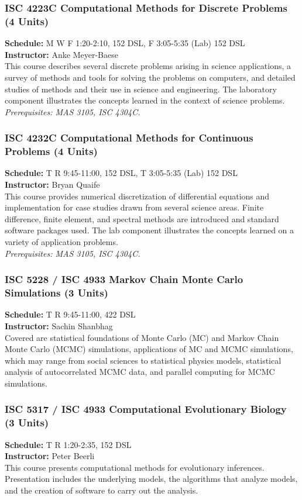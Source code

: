 \documentclass[12pt,a4paper]{article}
\begin{document}
\subsubsection*{ISC 4223C Computational Methods for Discrete Problems (4 Units)}
\textbf{Schedule:} M W F 1:20-2:10, 152 DSL, F 3:05-5:35 (Lab) 152 DSL \\
\textbf{Instructor:} Anke Meyer-Baese \\
This course describes several discrete problems arising in science applications, a survey of methods and tools for solving the problems on computers, and detailed studies of methods and their use in science and engineering. The laboratory component illustrates the concepts learned in the context of science problems. \\
\textit{Prerequisites: MAS 3105, ISC 4304C.}

\subsubsection*{ISC 4232C Computational Methods for Continuous Problems (4 Units)}
\textbf{Schedule:} T R 9:45-11:00, 152 DSL, T 3:05-5:35 (Lab) 152 DSL \\
\textbf{Instructor:} Bryan Quaife \\
This course provides numerical discretization of differential equations and implementation for case studies drawn from several science areas. Finite difference, finite element, and spectral methods are introduced and standard software packages used. The lab component illustrates the concepts learned on a variety of application problems. \\
\textit{Prerequisites: MAS 3105, ISC 4304C.}

\subsubsection*{ISC 5228 / ISC 4933 Markov Chain Monte Carlo Simulations (3 Units)}
\textbf{Schedule:} T R 9:45-11:00, 422 DSL \\
\textbf{Instructor:} Sachin Shanbhag \\
Covered are statistical foundations of Monte Carlo (MC) and Markov Chain Monte Carlo (MCMC) simulations, applications of MC and MCMC simulations, which may range from social sciences to statistical physics models, statistical analysis of autocorrelated MCMC data, and parallel computing for MCMC simulations.

\subsubsection*{ISC 5317 / ISC 4933 Computational Evolutionary Biology (3 Units)}
\textbf{Schedule:} T R 1:20-2:35, 152 DSL \\
\textbf{Instructor:} Peter Beerli \\
This course presents computational methods for evolutionary inferences. Presentation includes the underlying models, the algorithms that analyze models, and the creation of software to carry out the analysis.
\end{document}

